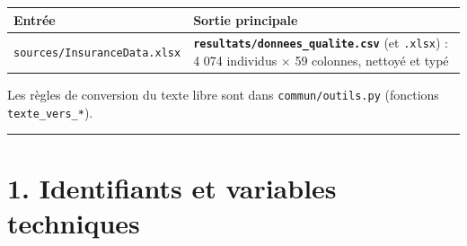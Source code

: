 \documentclass[

  french,

  10pt,

  a4paper,

]{article}
\newcounter{none} %
\begin{document}
{\def\LTcaptype{none} %

\begin{longtable}[]{@{}

  >{\raggedright\arraybackslash}p{}

  >{\raggedright\arraybackslash}p{}@{}}

\toprule\noalign{}

\begin{minipage}[b]{\linewidth}\raggedright

Entrée

\end{minipage} & \begin{minipage}[b]{\linewidth}\raggedright

Sortie principale

\end{minipage} \\

\midrule\noalign{}

\endhead

\bottomrule\noalign{}

\endlastfoot

\texttt{sources/InsuranceData.xlsx} & \textbf{\texttt{resultats/donnees\_qualite.csv}} (et \texttt{.xlsx}) : 4 074 individus \ensuremath{\times} 59 colonnes, nettoyé et typé \\

\end{longtable}

}



Les règles de conversion du texte libre sont dans \texttt{commun/outils.py} (fonctions \texttt{texte\_vers\_*}).



\begin{center}\rule{0.5\linewidth}{0.5pt}\end{center}



\section{1. Identifiants et variables techniques}
\end{document}
